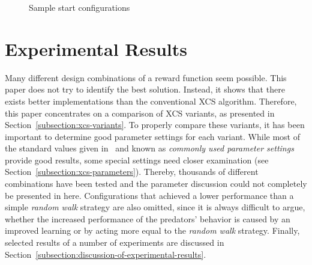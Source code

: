 \documentclass{sig-alternate}
\begin{document}
\begin{figure}[ht]
	\hfill
  \hfill
  \caption{Sample start configurations} %
  \label{figure:scenarios}
\end{figure}

%

\section{Experimental Results}
\label{section:experimental-results}

Many different design combinations of a reward function seem possible. This paper does not try to identify the best solution. Instead, it shows that there exists better implementations than the conventional XCS algorithm. Therefore, this paper concentrates on a comparison of XCS variants, as presented in Section~\ref{subsection:xcs-variants}. To properly compare these variants, it has been important to determine good parameter settings for each variant. While most of the standard values given in~\cite{BW02} and known as \emph{commonly used parameter settings} provide good results, some special settings need closer examination (see Section~\ref{subsection:xcs-parameters}). Thereby, thousands of different combinations have been tested and the parameter discussion could not completely be presented in here. Configurations that achieved a lower performance than a simple \emph{random walk} strategy are also omitted, since it is always difficult to argue, whether the increased performance of the predators' behavior is caused by an improved learning or by acting more equal to the \emph{random walk} strategy. Finally, selected results of a number of experiments are discussed in Section~\ref{subsection:discussion-of-experimental-results}.
\end{document}
